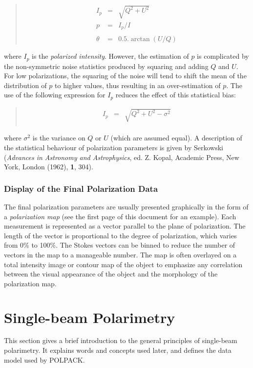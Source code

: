 \documentclass[twoside,11pt]{starlink}
\newenvironment{myquote}{\begin{quote}\begin{small}}{\end{small}\end{quote}}
\begin{document}
\begin{myquote}
\begin{eqnarray*}
  I_{p} & = & \sqrt{ Q^{2} + U^{2} } \\
  p & = & I_{p}/I \\ \\
  \theta & = & 0.5.\arctan (U/Q)
\end{eqnarray*}
\end{myquote}

where $I_{p}$ is the \emph{polarized intensity}. However, the estimation
of $p$ is complicated by the non-symmetric noise statistics produced by
squaring and adding $Q$ and $U$. For low polarizations, the squaring of
the noise will tend to shift the mean of the distribution of $p$ to
higher values, thus resulting in an over-estimation of $p$. The use of
the following expression for $I_{p}$ reduces the effect of this
statistical bias:

\begin{myquote}
\begin{eqnarray*}
  I_{p} & = & \sqrt{ Q^{2} + U^{2} - \sigma^{2}} \\
\end{eqnarray*}
\end{myquote}

where $\sigma^{2}$ is the variance on $Q$ or $U$ (which are assumed
equal). A description of the statistical behaviour of polarization
parameters is given by Serkowski (\emph{Advances in Astronomy and
Astrophysics}, ed. Z. Kopal, Academic Press, New York, London (1962),
\textbf{1}, 304).

\subsubsection{Display of the Final Polarization Data}
The final polarization parameters are usually presented graphically in
the form of a \emph{polarization map} (see the first page of this document
for an example). Each measurement is represented as a vector parallel to
the plane of polarization. The length of the vector is proportional to
the degree of polarization, which varies from 0\% to 100\%. The Stokes
vectors can be binned to reduce the number of vectors in the map to a
manageable number. The map is often overlayed on a total intensity image
or contour map of the object to emphasize any correlation between the
visual appearance of the object and the morphology of the polarization
map.

\section{\label{SEC:SBPOL}Single-beam Polarimetry}
This section gives a brief introduction to the general principles of
single-beam polarimetry. It explains words and concepts used later, and
defines the data model used by POLPACK.
\end{document}
